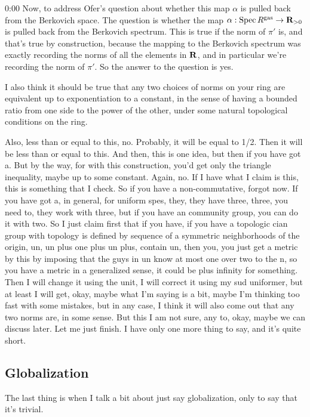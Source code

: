 \begin{unfinished}{0:00}
Now, to address Ofer's question about whether this map $\alpha$ is pulled back from the Berkovich space. The question is whether the map $\alpha: \operatorname{Spec} R^{\mathrm{gas}} \to \mathbf R_{>0}$ is pulled back from the Berkovich spectrum. This is true if the norm of $\pi'$ is, and that's true by construction, because the mapping to the Berkovich spectrum was exactly recording the norms of all the elements in $\mathbf R$, and in particular we're recording the norm of $\pi'$. So the answer to the question is yes.

I also think it should be true that any two choices of norms on your ring are equivalent up to exponentiation to a constant, in the sense of having a bounded ratio from one side to the power of the other, under some natural topological conditions on the ring.

Also, less than or equal to this, no. Probably, it will be equal to 1/2. Then it will be less than or equal to this. And then, this is one idea, but then if you have got a. But by the way, for with this construction, you'd get only the triangle inequality, maybe up to some constant. Again, no. If I have what I claim is this, this is something that I check. So if you have a non-commutative, forgot now. If you have got a, in general, for uniform spes, they, they have three, three, you need to, they work with three, but if you have an community group, you can do it with two. So I just claim first that if you have, if you have a topologic cian group with topology is defined by sequence of a symmetric neighborhoods of the origin, un, un plus one plus un plus, contain un, then you, you just get a metric by this by imposing that the guys in un know at most one over two to the n, so you have a metric in a generalized sense, it could be plus infinity for something. Then I will change it using the unit, I will correct it using my sud uniformer, but at least I will get, okay, maybe what I'm saying is a bit, maybe I'm thinking too fast with some mistakes, but in any case, I think it will also come out that any two norms are, in some sense. But this I am not sure, any to, okay, maybe we can discuss later. Let me just finish. I have only one more thing to say, and it's quite short.

\subsection{Globalization}
The last thing is when I talk a bit about just say globalization, only to say that it's trivial. 


\end{unfinished}
